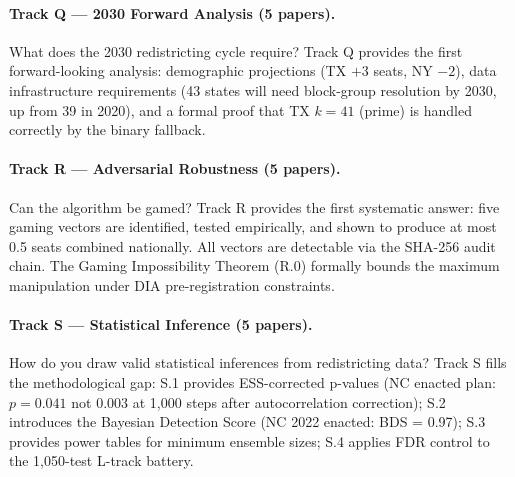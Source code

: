 \paragraph{Track Q --- 2030 Forward Analysis (5 papers).}
What does the 2030 redistricting cycle require?
Track Q provides the first forward-looking analysis: demographic projections
(TX $+3$ seats, NY $-2$), data infrastructure requirements (43 states will need
block-group resolution by 2030, up from 39 in 2020), and a formal proof that
TX $k=41$ (prime) is handled correctly by the binary fallback.

\paragraph{Track R --- Adversarial Robustness (5 papers).}
Can the algorithm be gamed?
Track R provides the first systematic answer: five gaming vectors are identified,
tested empirically, and shown to produce at most 0.5 seats combined nationally.
All vectors are detectable via the SHA-256 audit chain.
The Gaming Impossibility Theorem (R.0) formally bounds the maximum manipulation
under DIA pre-registration constraints.

\paragraph{Track S --- Statistical Inference (5 papers).}
How do you draw valid statistical inferences from redistricting data?
Track S fills the methodological gap:
S.1 provides ESS-corrected p-values (NC enacted plan: $p = 0.041$ not $0.003$
at 1{,}000 steps after autocorrelation correction);
S.2 introduces the Bayesian Detection Score (NC 2022 enacted: BDS = 0.97);
S.3 provides power tables for minimum ensemble sizes;
S.4 applies FDR control to the 1{,}050-test L-track battery.
